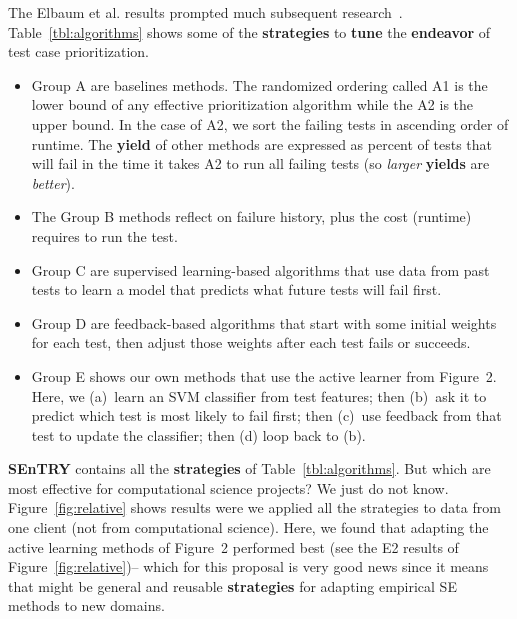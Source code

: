 \documentclass{NSF}
\newenvironment{myitemize}
{ \begin{itemize}
    \setlength{\itemsep}{0pt}
    \setlength{\parskip}{0pt}
    \setlength{\parsep}{0pt}     }
{ \end{itemize}                  }
\newcommand{\bi}{\begin{myitemize}}
\newcommand{\ei}{\end{myitemize}}
\newcommand{\tbl}[1]{Table~\ref{tbl:#1}}
\newcommand{\fig}[1]{Figure~\ref{fig:#1}}
\newcommand{\IT}{{\bf {\sffamily SEnTRY}}}
\begin{document}
\begin{nsfdescription}
The Elbaum et al. results prompted much subsequent research~\cite{google,cost-based,38,97,182,59,183,103,132,158,Yu:2018}.
 \tbl{algorithms} shows some of the 
{\bf strategies} to {\bf tune} the {\bf endeavor} of test case prioritization.
\bi
\item
Group A are baselines methods.
The randomized ordering called A1 is the lower bound of any effective prioritization algorithm while the  A2 is the upper bound. In the case of A2, we sort the failing
tests in ascending order of runtime.
The {\bf yield}  of  other methods are expressed as percent of tests
that will fail in the time it takes A2 to run all failing tests (so {\em larger} 
{\bf yields} are {\em better}).
\item The Group 
  B methods  reflect on   failure history, plus
   the  cost (runtime) requires to run the test. 
  \item
  Group C are supervised learning-based algorithms that use data from past tests to learn a model that predicts what future tests will fail first.
  \item Group D are feedback-based algorithms that start with some initial weights for each test, then adjust those weights after each test fails or succeeds. 
  \item   Group E shows  our own methods that use 
  the   active learner from Figure~2. Here, we  (a)~learn
  an SVM classifier from test features; then   
  (b)~ask it 
  to predict which  test is most likely to fail first; then (c)~use feedback from
  that test to  update the  classifier; then (d) loop back to (b).
  \ei
  {\IT}  contains all the {\bf strategies} of \tbl{algorithms}. But which
  are most effective for computational science projects? We just do not know.
  \fig{relative} shows results were we applied all the strategies to data from one client (not from computational science). Here, we found that adapting the active learning methods of Figure~2 performed best (see the E2 results of   \fig{relative})-- which for this proposal is very good news since it means that might be general and reusable {\bf strategies}
  for adapting  empirical SE  methods to new domains. 
  

\end{nsfdescription}
\end{document}
